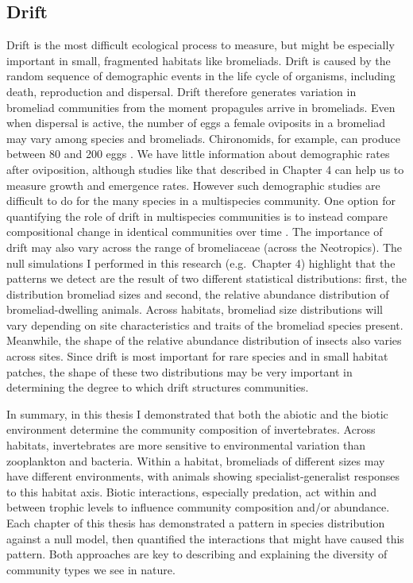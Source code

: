 \subsection{Drift}\label{drift}

Drift is the most difficult ecological process to measure, but might be
especially important in small, fragmented habitats like bromeliads.
Drift is caused by the random sequence of demographic events in the life
cycle of organisms, including death, reproduction and dispersal. Drift
therefore generates variation in bromeliad communities from the moment
propagules arrive in bromeliads. Even when dispersal is active, the
number of eggs a female oviposits in a bromeliad may vary among species
and bromeliads. Chironomids, for example, can produce between 80 and 200
eggs \citep{}. We have little information about demographic
rates after oviposition, although studies like that described in Chapter
4 can help us to measure growth and emergence rates. However such
demographic studies are difficult to do for the many species in a
multispecies community. One option for quantifying the role of drift in
multispecies communities is to instead compare compositional change in
identical communities over time \citep{Vellend2010b}. The importance of
drift may also vary across the range of bromeliaceae (across the
Neotropics). The null simulations I performed in this research
(e.g.~Chapter 4) highlight that the patterns we detect are the
result of two different statistical distributions: first, the distribution bromeliad sizes and second, the relative abundance distribution of
bromeliad-dwelling animals. Across habitats, bromeliad size distributions will vary depending on site characteristics and traits of the
bromeliad species present. Meanwhile, the shape of the relative
abundance distribution of insects also varies across sites. Since drift
is most important for rare species and in small habitat patches, the
shape of these two distributions may be very important in determining
the degree to which drift structures communities.

In summary, in this thesis I demonstrated that both the abiotic and the
biotic environment determine the community composition of invertebrates.
Across habitats, invertebrates are more sensitive to environmental
variation than zooplankton and bacteria. Within a habitat, bromeliads of
different sizes may have different environments, with animals showing
specialist-generalist responses to this habitat axis. Biotic
interactions, especially predation, act within and between trophic
levels to influence community composition and/or abundance. Each chapter
of this thesis has demonstrated a pattern in species distribution
against a null model, then quantified the interactions that might have
caused this pattern. Both approaches are key to describing and
explaining the diversity of community types we see in nature.
